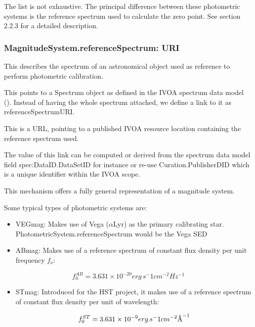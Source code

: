 \documentclass[11pt,a4paper]{ivoa}
\newcommand{\angstrom}{\textup{\AA}}
\begin{document}

The list is not exhaustive. The principal difference between these photometric systems is the reference spectrum used to calculate the zero point. See section 2.2.3 for a detailed description.
\par

\subsubsection{MagnitudeSystem.referenceSpectrum: URI}
This describes the spectrum of an astronomical object used as reference to perform photometric calibration.
\par

This points to a Spectrum object as defined in the IVOA spectrum data model (\cite{mcdowell2012ivoa}). Instead of having the whole spectrum attached, we define a link to it as referenceSpectrumURI.
\par

This is a URL, pointing to a published IVOA resource location containing the reference spectrum used.
\par

The value of this link can be computed or derived from the spectrum data model field spec:DataID.DataSetID for instance or re-use Curation.PublisherDID which is a unique identifier within the IVOA scope.
\par

This mechanism offers a fully general representation of a magnitude system.\par

Some typical types of photometric systems are:
\par

\begin{itemize}
	\item VEGmag: Makes use of Vega ($\alpha $Lyr) as the primary calibrating star. PhotometricSystem.referenceSpectrum would be the Vega SED\par

	\item ABmag: Makes use of a reference spectrum of constant flux density per unit frequency $f_\nu $:
\end{itemize}\par
\[
f_0^{AB} = 3.631 \times 10^{-20} erg\, s^-1 cm^{-2} Hz^{-1}
\]

\begin{itemize}
	\item STmag: Introduced for the HST project, it makes use of a reference spectrum of constant flux density per unit of wavelength:\par
\[
f_0^{ST} = 3.631 \times 10^{-9} erg\, s^-1 cm^{-2} \angstrom ^{-1}
\]
\end{itemize}
\end{document}
